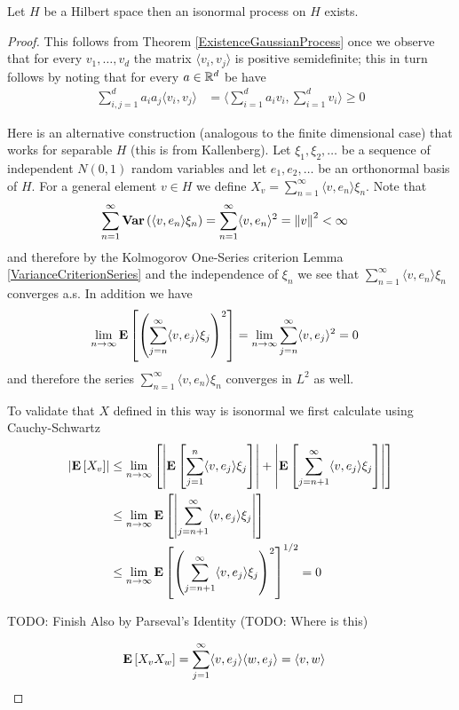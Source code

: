 \begin{prop}\label{ExistenceIsonormalProcess}Let $H$ be a Hilbert space then an isonormal process on $H$ exists.
\end{prop}
\begin{proof}
This follows from Theorem \ref{ExistenceGaussianProcess} once we observe that for every $v_1, \dotsc, v_d$ the matrix $\langle v_i, v_j \rangle$ is positive semidefinite; this in turn follows by noting that for every $a \in \mathbb{R}^d$ be have 
\begin{align*}
\sum_{i,j = 1}^d a_i a_j \langle v_i, v_j \rangle &= \langle \sum_{i=1}^d a_i v_i, \sum_{i=1}^d  v_i \rangle \geq 0
\end{align*}

Here is an alternative construction (analogous to the finite dimensional case) that works for separable $H$ (this is from Kallenberg).  
Let $\xi_1, \xi_2, \dotsc$ be a sequence of independent $N(0,1)$ random variables and let $e_1, e_2, \dotsc$ be an orthonormal basis of $H$.  For a general element $v \in H$ we define 
$X_v = \sum_{n=1}^\infty \langle v, e_n \rangle \xi_n$.  Note that 
\begin{align*}
\sum_{n=1}^\infty \textbf{Var} \left (\langle v, e_n \rangle \xi_n \right ) 
&= \sum_{n=1}^\infty  \langle v, e_n \rangle^2 = \left \lVert v \right \rVert^2 < \infty
\end{align*}
and therefore by the Kolmogorov One-Series criterion Lemma \ref{VarianceCriterionSeries} and the independence of $\xi_n$ we see that $\sum_{n=1}^\infty \langle v, e_n \rangle \xi_n$ converges a.s.  In addition we have 
\begin{align*}
\lim_{n \to \infty} \textbf{E}\left[\left( \sum_{j=n}^\infty \langle v, e_j \rangle \xi_j \right)^2\right] 
&=\lim_{n \to \infty} \sum_{j=n}^\infty \langle v, e_j \rangle^2 = 0
\end{align*}
and therefore the series $\sum_{n=1}^\infty \langle v, e_n \rangle \xi_n$ converges in $L^2$ as well.

To validate that $X$ defined in this way is isonormal we first calculate using Cauchy-Schwartz
\begin{align*}
\left \vert \textbf{E}\left[X_v\right]  \right \vert
&\leq \lim_{n \to \infty} \left[\left \vert \textbf{E}\left[\sum_{j=1}^n \langle v, e_j \rangle \xi_j\right] \right \vert + \left \vert \textbf{E}\left[\sum_{j=n+1}^\infty \langle v, e_j \rangle \xi_j\right] \right \vert \right] \\
&\leq \lim_{n \to \infty} \textbf{E}\left[\left \vert \sum_{j=n+1}^\infty \langle v, e_j \rangle \xi_j \right \vert\right] \\
&\leq \lim_{n \to \infty} \textbf{E}\left[\left( \sum_{j=n+1}^\infty \langle v, e_j \rangle \xi_j \right )^2\right]^{1/2} = 0 \\
\end{align*}

TODO: Finish
Also  by Parseval's Identity (TODO: Where is this)

\begin{align*}
\textbf{E}\left[X_v X_w\right] 
&= \sum_{j=1}^\infty \langle v, e_j \rangle \langle w, e_j \rangle = \langle v, w \rangle
\end{align*}
\end{proof}

